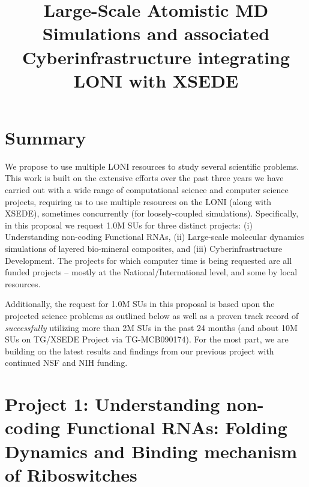 \documentclass[a4paper,11pt]{article}
\begin{document}
\title{\Large Large-Scale Atomistic MD Simulations and associated
  Cyberinfrastructure integrating LONI with XSEDE}

\date{}

\maketitle
 
\section{Summary}
We propose to use multiple LONI resources to study several scientific
problems. This work is built on the extensive efforts over the past
three years we have carried out with a wide range of computational
science and computer science projects, requiring us to use multiple
resources on the LONI (along with XSEDE), sometimes concurrently (for
loosely-coupled simulations).  Specifically, in this proposal we
request 1.0M SUs for three distinct projects: (i) Understanding
non-coding Functional RNAs, (ii) Large-scale molecular dynamics
simulations of layered bio-mineral composites, and (iii)
Cyberinfrastructure Development. The projects for which computer time
is being requested are all funded projects -- mostly at the
National/International level, and some by local resources.

Additionally, the request for 1.0M SUs in this proposal is based upon
the projected science problems as outlined below as well as a proven
track record of {\it successfully} utilizing more than 2M SUs in the
past 24 months (and about 10M SUs on TG/XSEDE Project via
TG-MCB090174). For the most part, we are building on the latest
results and findings from our previous project with continued NSF and
NIH funding.


\section{Project 1: Understanding non-coding Functional RNAs: 
Folding Dynamics and Binding mechanism of Riboswitches}
\end{document}
